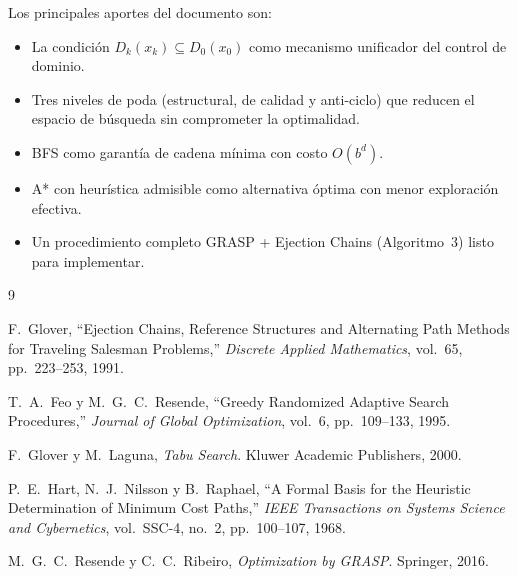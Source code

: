 \documentclass[12pt, a4paper]{article}
\theoremstyle{definition}
\theoremstyle{plain}
\theoremstyle{remark}
\newcommand{\domk}[2]{D_{#1}\!\left(#2\right)}
\begin{document}
Los principales aportes del documento son:

\begin{itemize}
  \item La condición $\domk{k}{x_k} \subseteq \domk{0}{x_0}$ como mecanismo
        unificador del control de dominio.
  \item Tres niveles de poda (estructural, de calidad y anti-ciclo) que reducen
        el espacio de búsqueda sin comprometer la optimalidad.
  \item BFS como garantía de cadena mínima con costo $O(b^d)$.
  \item A* con heurística admisible como alternativa óptima con menor
        exploración efectiva.
  \item Un procedimiento completo GRASP + Ejection Chains (Algoritmo~3)
        listo para implementar.
\end{itemize}

\newpage
\begin{thebibliography}{9}

  F.~Glover,
  ``Ejection Chains, Reference Structures and Alternating Path Methods
    for Traveling Salesman Problems,''
  \textit{Discrete Applied Mathematics}, vol.~65, pp.~223--253, 1991.

  T.~A.~Feo y M.~G.~C.~Resende,
  ``Greedy Randomized Adaptive Search Procedures,''
  \textit{Journal of Global Optimization}, vol.~6, pp.~109--133, 1995.

  F.~Glover y M.~Laguna,
  \textit{Tabu Search}.
  Kluwer Academic Publishers, 2000.

  P.~E.~Hart, N.~J.~Nilsson y B.~Raphael,
  ``A Formal Basis for the Heuristic Determination of Minimum Cost Paths,''
  \textit{IEEE Transactions on Systems Science and Cybernetics},
  vol.~SSC-4, no.~2, pp.~100--107, 1968.

  M.~G.~C.~Resende y C.~C.~Ribeiro,
  \textit{Optimization by GRASP}.
  Springer, 2016.

\end{thebibliography}
\end{document}
